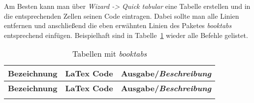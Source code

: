 Am Besten kann man über \emph{Wizard -> Quick tabular} eine Tabelle erstellen und in die entsprechenden Zellen seinen Code eintragen. Dabei sollte man alle Linien entfernen und anschließend die eben erwähnten Linien des Paketes \emph{booktabs} entsprechend einfügen. Beispielhaft sind in Tabelle~\ref{tab: booktabs} wieder alle Befehle gelistet.%
\renewcommand{\arraystretch}{1.3}
\begin{longtable}[l]{p{}p{}p{}}
\caption{Tabellen mit \emph{booktabs}}%
\label{tab: booktabs}%
\tabularnewline
 
 \toprule
 \textbf{Bezeichnung} & \textbf{LaTex Code} & \textbf{Ausgabe/\emph{Beschreibung}}\tabularnewline
 \midrule
 \endfirsthead
 
 \toprule
 \textbf{Bezeichnung} & \textbf{LaTex Code} & \textbf{Ausgabe/\emph{Beschreibung}}\tabularnewline
 \midrule
 \endhead
 
 \bottomrule
 \endfoot
 
 \bottomrule
 \endlastfoot
 

\end{longtable}

